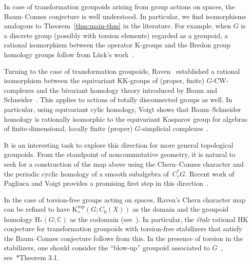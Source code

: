 \documentclass[a4paper,reqno]{amsart}
\theoremstyle{plain}
\theoremstyle{definition}
\theoremstyle{remark}
\numberwithin{equation}{section}
\newcommand{\rH}{\mathrm{H}}
\newcommand{\rK}{\mathrm{K}}
\newcommand{\dC}{\mathbb{C}}
\newcommand{\KK}{\mathrm{KK}}
\begin{document}
In case of transformation groupoids arising from group actions on spaces, the Baum--Connes conjecture is well understood.
In particular, we find isomorphisms analogous to Theorem~\ref{thm:main-thm} in the literature.
For example, when $G$ is a discrete group (possibly with torsion elements) regarded as a groupoid, a rational isomorphism between the operator K-groups and the Bredon group homology groups follow from Lück's work~\cite{lueck:chern}.

Turning to the case of transformation groupoids, Raven~\cite{raven:phd} established a rational isomorphism between the equivariant $\KK$-groups of (proper, finite) $G$-CW-complexes and the bivariant homology theory introduced by Baum and Schneider~\cites{bs:chern}. 
This applies to actions of totally disconnected groups as well. In particular, using equivariant cylic homology, Voigt shows that Baum--Schneider homology is rationally isomorphic to the equivariant Kasparov group for algebras of finite-dimensional, locally finite (proper) $G$-simplicial complexes~\cite{voigt:chern}.

It is an interesting task to explore this direction for more general topological groupoids. From the standpoint of noncommutative geometry, it is natural to seek for a construction of the map above using the Chern--Connes character and the periodic cyclic homology of a smooth subalgebra of~$C^*_r G$. 
Recent work of Pagliuca and Voigt provides a promising first step in this direction~\cite{pv:cycg}.

In the case of torsion-free groups acting on spaces, Raven's Chern character map can be refined to have $\rK_*^{\mathrm{top}}(G; C_0(X))$ as the domain and the groupoid homology $\rH_*(G;\dC)$ as the codomain (see~\cite{dw:hk}).
In particular, the \emph{étale} rational HK conjecture for transformation groupoids with torsion-free stabilizers that satisfy the Baum--Connes conjecture follows from this.
In the presence of torsion in the stabilizers, one should consider the ``blow-up'' groupoid associated to $G$~\cite{bc:chern}, see~\cite{dw:hk}*{Theorem 3.1}.

\smallskip
\end{document}
